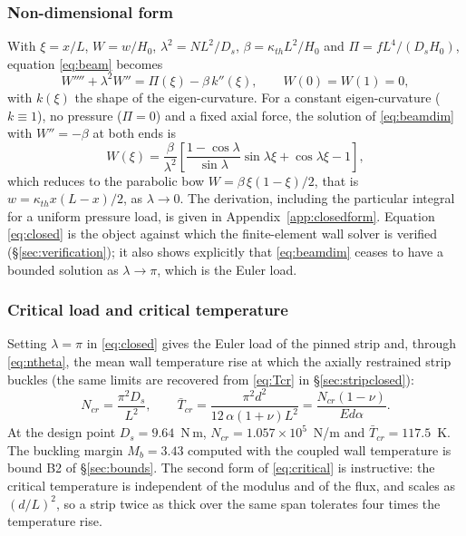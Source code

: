 \documentclass[11pt,a4paper]{article}
\begin{document}
\subsubsection{Non-dimensional form}
\label{sec:closedform}

With $\xi=x/L$, $W=w/H_0$, $\lambda^2=NL^2/D_s$, $\beta=\kappa_{th}L^2/H_0$
and $\Pi=fL^4/(D_sH_0)$, equation \eqref{eq:beam} becomes
\begin{equation}
W''''+\lambda^2W''=\Pi(\xi)-\beta\,k''(\xi),
\qquad W(0)=W(1)=0,
\label{eq:beamdim}
\end{equation}
with $k(\xi)$ the shape of the eigen-curvature. For a constant
eigen-curvature ($k\equiv1$), no pressure ($\Pi=0$) and a fixed axial force,
the solution of \eqref{eq:beamdim} with $W''=-\beta$ at both ends is
\begin{equation}
W(\xi)=\frac{\beta}{\lambda^2}\left[
\frac{1-\cos\lambda}{\sin\lambda}\sin\lambda\xi+\cos\lambda\xi-1\right],
\label{eq:closed}
\end{equation}
which reduces to the parabolic bow $W=\beta\,\xi(1-\xi)/2$, that is
$w=\kappa_{th}x(L-x)/2$, as $\lambda\to0$. The derivation, including the
particular integral for a uniform pressure load, is given in
Appendix~\ref{app:closedform}. Equation \eqref{eq:closed} is the object
against which the finite-element wall solver is verified
(\S\ref{sec:verification}); it also shows explicitly that
\eqref{eq:beamdim} ceases to have a bounded solution as $\lambda\to\pi$,
which is the Euler load.

\subsubsection{Critical load and critical temperature}
\label{sec:critical}

Setting $\lambda=\pi$ in \eqref{eq:closed} gives the Euler load of the pinned
strip and, through \eqref{eq:ntheta}, the mean wall temperature rise at which
the axially restrained strip buckles (the same limits are recovered from
\eqref{eq:Tcr} in \S\ref{sec:stripclosed}):
\begin{equation}
N_{cr}=\frac{\pi^2D_s}{L^2},
\qquad
\bar T_{cr}=\frac{\pi^2 d^2}{12\,\alpha(1+\nu)L^2}
=\frac{N_{cr}(1-\nu)}{E d\alpha}.
\label{eq:critical}
\end{equation}
At the design point $D_s=9.64$~N\,m, $N_{cr}=1.057\times10^{5}$~N/m and
$\bar T_{cr}=117.5$~K. The buckling margin $M_b=3.43$ computed with the
coupled wall temperature is bound B2 of \S\ref{sec:bounds}. The second form of
\eqref{eq:critical} is instructive: the critical temperature is independent of
the modulus and of the flux, and scales as $(d/L)^2$, so a strip twice as
thick over the same span tolerates four times the temperature rise.
\end{document}
